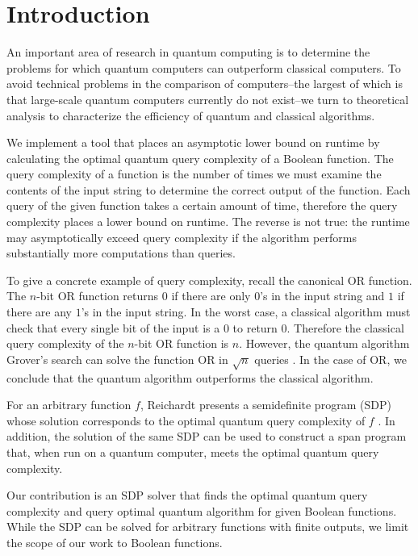 \section{Introduction}

An important area of research in quantum computing is
to determine the problems for which quantum
computers can outperform classical computers.
To avoid technical problems in the comparison of 
computers--the largest
of which is that large-scale quantum computers
currently do not exist--we turn to theoretical
analysis to characterize the efficiency of 
quantum and classical algorithms.

We implement a tool that places an asymptotic lower bound on runtime by calculating the optimal quantum query complexity of a Boolean function.
The query complexity of a function 
is the number of times we must examine the
contents of the input string to determine the correct
output of the function. 
Each query of the given function takes a certain
amount of time, therefore the query
complexity places a lower bound on runtime.
The reverse is not true: the runtime
may asymptotically exceed query complexity
if the algorithm performs substantially more
computations than queries.

To give a concrete example of query complexity,
recall the canonical OR function.
The $n$-bit OR
function returns $0$ if there are only $0$'s in the input
string and $1$ if there are any $1$'s in the input string.
In the worst case, a classical algorithm must check that
every single bit of the input is a $0$ to return $0$.
Therefore the classical query complexity of the $n$-bit OR
function is $n$. 
However, the quantum algorithm Grover's
search can solve the function OR in $\sqrt{n}$ queries
\cite{grover1996fast}. In the case of OR, we conclude that
the quantum algorithm outperforms the classical algorithm.

For an arbitrary function $f$,
Reichardt presents a semidefinite program (SDP)
whose solution corresponds to the optimal quantum query complexity
of $f$ \cite{reichardt2009span}.
In addition, the solution of the same SDP can
be used to construct a span program that, when run
on a quantum computer, meets the optimal quantum query complexity.

Our contribution is an SDP solver
that finds the optimal quantum query complexity
and query optimal quantum algorithm for given Boolean functions.
While the SDP can be solved for arbitrary functions with finite outputs,
we limit the scope of our work to Boolean functions.

